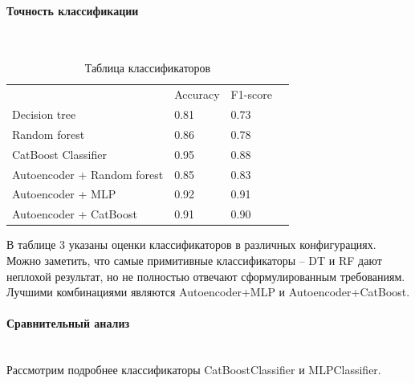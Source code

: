         \paragraph{Точность классификации \\} \\
        \noindent
        \begin{table}[h!]
        \begin{tabular}{l|l|l|l}
        \cline{2-3}
                                                          & Accuracy & F1-score &  \\ \cline{1-3}
        \multicolumn{1}{|l|}{Decision tree}               & 0.81     & 0.73     &  \\ \cline{1-3}
        \multicolumn{1}{|l|}{Random forest}               & 0.86     & 0.78     &  \\ \cline{1-3}
        \multicolumn{1}{|l|}{CatBoost Classifier}         & 0.95     & 0.88     &  \\ \cline{1-3}
        \multicolumn{1}{|l|}{Autoencoder + Random forest} & 0.85     & 0.83     &  \\ \cline{1-3}
        \multicolumn{1}{|l|}{Autoencoder + MLP}           & 0.92     & 0.91     &  \\ \cline{1-3}
        \multicolumn{1}{|l|}{Autoencoder + CatBoost}      & 0.91     & 0.90     &  \\ \cline{1-3}
        \end{tabular}
        \caption{Таблица классификаторов}
        \label{tab:my-table}
        \end{table}
        В таблице 3 указаны оценки классификаторов в различных конфигурациях. \\Можно заметить, что самые примитивные классификаторы – DT и RF дают неплохой результат, но не полностью отвечают сформулированным требованиям. Лучшими комбинациями являются Autoencoder+MLP и Autoencoder+CatBoost.
        \newpage
        \paragraph{Сравнительный анализ}
        \noindent\\
        Рассмотрим подробнее классификаторы CatBoostClassifier и MLPClassifier.
        
